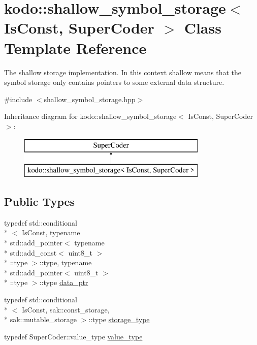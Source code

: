 \hypertarget{classkodo_1_1shallow__symbol__storage}{\section{kodo\-:\-:shallow\-\_\-symbol\-\_\-storage$<$ Is\-Const, Super\-Coder $>$ Class Template Reference}
\label{classkodo_1_1shallow__symbol__storage}
}


The shallow storage implementation. In this context shallow means that the symbol storage only contains pointers to some external data structure.  




{\ttfamily \#include $<$shallow\-\_\-symbol\-\_\-storage.\-hpp$>$}

Inheritance diagram for kodo\-:\-:shallow\-\_\-symbol\-\_\-storage$<$ Is\-Const, Super\-Coder $>$\-:\begin{figure}[H]
\begin{center}
\leavevmode
\includegraphics[height=2.000000cm]{classkodo_1_1shallow__symbol__storage}
\end{center}
\end{figure}
\subsection*{Public Types}
\begin{DoxyCompactItemize}
\item 
typedef std\-::conditional\\*
$<$ Is\-Const, typename \\*
std\-::add\-\_\-pointer$<$ typename \\*
std\-::add\-\_\-const$<$ uint8\-\_\-t $>$\\*
\-::type $>$\-::type, typename \\*
std\-::add\-\_\-pointer$<$ uint8\-\_\-t $>$\\*
\-::type $>$\-::type \hyperlink{classkodo_1_1shallow__symbol__storage_ae30b89454fcd5e9d9afd516ffc103753}{data\-\_\-ptr}
\item 
typedef std\-::conditional\\*
$<$ Is\-Const, sak\-::const\-\_\-storage, \\*
sak\-::mutable\-\_\-storage $>$\-::type \hyperlink{classkodo_1_1shallow__symbol__storage_a258cef59dc5a316875bcdce09ab0c338}{storage\-\_\-type}
\item 
typedef Super\-Coder\-::value\-\_\-type \hyperlink{classkodo_1_1shallow__symbol__storage_abb7de59459d66e0eeb8a6406b074122f}{value\-\_\-type}
\begin{DoxyCompactList}\small\item\em \end{DoxyCompactList}\end{DoxyCompactItemize}
